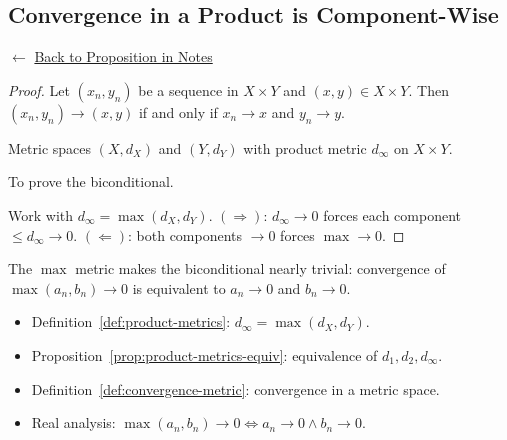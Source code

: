 
\subsection*{Convergence in a Product is Component-Wise}
\label{prf:product-convergence}

\begin{remark*}[Return]
$\leftarrow$ \hyperref[prop:product-convergence]{Back to Proposition in Notes}
\end{remark*}

\begin{proof}
\Claim Let $(x_n, y_n)$ be a sequence in $X \times Y$ and $(x,y) \in X \times Y$.
Then $(x_n, y_n) \to (x,y)$ if and only if $x_n \to x$ and $y_n \to y$.

\Given Metric spaces $(X, d_X)$ and $(Y, d_Y)$ with product metric $d_\infty$
on $X \times Y$.

\Goal To prove the biconditional.

\Strategy Work with $d_\infty = \max(d_X, d_Y)$.
$(\Rightarrow)$: $d_\infty \to 0$ forces each component $\le d_\infty \to 0$.
$(\Leftarrow)$: both components $\to 0$ forces $\max \to 0$.


\end{proof}

\begin{remark*}
The $\max$ metric makes the biconditional nearly trivial:
convergence of $\max(a_n, b_n) \to 0$ is equivalent to
$a_n \to 0$ and $b_n \to 0$.
\end{remark*}

\begin{remark*}[Dependencies]
\begin{itemize}
  \item Definition~\ref{def:product-metrics}: $d_\infty = \max(d_X, d_Y)$.
  \item Proposition~\ref{prop:product-metrics-equiv}: equivalence of $d_1, d_2, d_\infty$.
  \item Definition~\ref{def:convergence-metric}: convergence in a metric space.
  \item Real analysis: $\max(a_n, b_n) \to 0 \iff a_n \to 0 \land b_n \to 0$.
\end{itemize}
\end{remark*}
